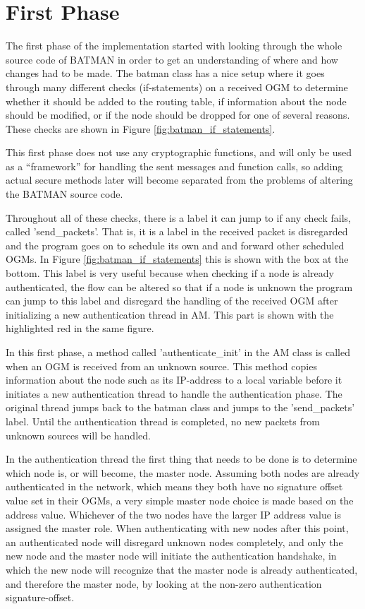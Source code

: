 \section{First Phase}
The first phase of the implementation started with looking through the whole
source code of BATMAN in order to get an understanding of where and how changes
had to be made. The batman class has a nice setup where it goes through many
different checks (if-statements) on a received \ac{OGM} to determine whether it
should be added to the routing table, if information about the node should be
modified, or if the node should be dropped for one of several reasons. These
checks are shown in Figure \ref{fig:batman_if_statements}.

This first phase does not use any cryptographic functions, and will only be used
as a ``framework'' for handling the sent messages and function calls, so adding
actual secure methods later will become separated from the problems of altering
the BATMAN source code.

Throughout all of these checks, there is a label it can jump to if any check
fails, called 'send\_packets'. That is, it is a label in the received packet is
disregarded and the program goes on to schedule its own and and forward other
scheduled \acp{OGM}. In Figure \ref{fig:batman_if_statements} this is shown
with the box at the bottom. This label is very useful because when checking if a
node is already authenticated, the flow can be altered so that if a node is
unknown the program can jump to this label and disregard the handling of the
received \ac{OGM} after initializing a new authentication thread in \ac{AM}.
This part is shown with the highlighted red in the same figure.

In this first phase, a method called 'authenticate\_init' in the \ac{AM} class
is called when an \ac{OGM} is received from an unknown source. This method
copies information about the node such as its IP-address to a local variable
before it initiates a new authentication thread to handle the authentication
phase. The original thread jumps back to the batman class and jumps to the
'send\_packets' label. Until the authentication thread is completed, no new
packets from unknown sources will be handled.

In the authentication thread the first thing that needs to be done is to
determine which node is, or will become, the master node. Assuming both nodes
are already authenticated in the network, which means they both have no
signature offset value set in their \acp{OGM}, a very simple master node choice
is made based on the address value. Whichever of the two nodes have the larger
IP address value is assigned the master role. When authenticating with new nodes
after this point, an authenticated node will disregard unknown nodes
completely, and only the new node and the master node will initiate
the authentication handshake, in which the new node will recognize that the
master node is already authenticated, and therefore the master node, by looking
at the non-zero authentication signature-offset.

